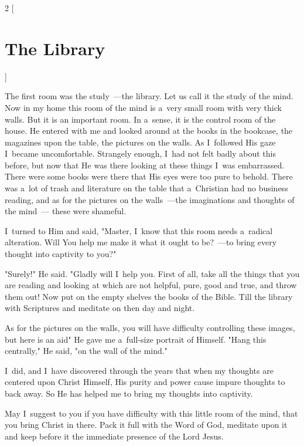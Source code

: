 \documentclass[a4paper,12pt]{article}
\begin{document}
\begin{multicols}{2}
    [
\section*{The Library}
    ]

The first room was the study~---the library. Let us call it the study of the mind. Now in my home this room of the mind is a~very small room with very thick walls. But it is an important room. In a~sense, it is the control room of the house. He entered with me and looked around at the books in the bookcase, the magazines upon the table, the pictures on the walls. As I~followed His gaze I~became uncomfortable. Strangely enough, I~had not felt badly about this before, but now that He was there looking at these things I~was embarrassed. There were some books were there that His eyes were too pure to behold. There was a~lot of trash and literature on the table that a~Christian had no business reading, and as for the pictures on the walls~---the imaginations and thoughts of the mind~--- these were shameful. 

I~turned to Him and said, "Master, I~know that this room needs a~radical alteration. Will You help me make it what it ought to be?~---to bring every thought into captivity to you?" 

"Surely!" He said. "Gladly will I~help you. First of all, take all the things that you are reading and looking at which are not helpful, pure, good and true, and throw them out! Now put on the empty shelves the books of the Bible. Till the library with Scriptures and meditate on then day and night. 

As for the pictures on the walls, you will have difficulty controlling these images, but here is an aid" He gave me a~full-size portrait of Himself. "Hang this centrally," He said, "on the wall of the mind." 

I~did, and I~have discovered through the years that when my thoughts are centered upon Christ Himself, His purity and power cause impure thoughts to back away. So He has helped me to bring my thoughts into captivity. 

May I~suggest to you if you have difficulty with this little room of the mind, that you bring Christ in there. Pack it full with the Word of God, meditate upon it and keep before it the immediate presence of the Lord Jesus. 
\end{multicols}
\end{document}
